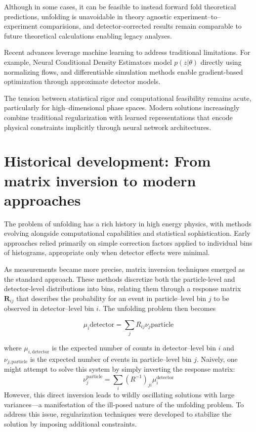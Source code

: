 Although in some cases, it can be feasible to instead forward fold theoretical predictions, unfolding is unavoidable in theory agnostic experiment--to--experiment comparisions, and detector-corrected results remain comparable to future theoretical calculations enabling legacy analyses.

Recent advances leverage machine learning to address traditional limitations. For example, Neural Conditional Density Estimators model \(p(z|\theta)\) directly using normalizing flows, and differentiable simulation methods enable gradient-based optimization through approximate detector models.

The tension between statistical rigor and computational feasibility remains acute, particularly for high--dimensional phase spaces.
%
Modern solutions increasingly combine traditional regularization with learned representations that encode physical constraints implicitly through neural network architectures.

\section{Historical development: From matrix inversion to modern approaches}
\label{sec:ill-posed}

The problem of unfolding has a rich history in high energy physics, with methods evolving alongside computational capabilities and statistical sophistication.
%
Early approaches relied primarily on simple correction factors applied to individual bins of histograms, appropriate only when detector effects were minimal.

As measurements became more precise, matrix inversion techniques emerged as the standard approach.
%
These methods discretize both the particle-level and detector-level distributions into bins, relating them through a response matrix \(\mathbf{R}_{ij}\) that describes the probability for an event in particle--level bin \(j\) to be observed in detector--level bin \(i\).
%
The unfolding problem then becomes

\begin{equation}
\mu_i{\text{detector}} = \sum_j R_{ij} \nu_j{\text{particle}}
\end{equation}

where \(\mu_{i, \textrm{detector}}\) is the expected number of counts in detector--level bin \(i\) and \(\nu_{j, \textrm{particle}}\) is the expected number of events in particle--level bin $j$.
%
Naively, one might attempt to solve this system by simply inverting the response matrix:
\begin{equation}
\nu_j^{\text{particle}} = \sum_i (R^{-1})_{ji} \mu_i^{\text{detector}}
\end{equation}
However, this direct inversion leads to wildly oscillating solutions with large variances---a manifestation of the ill-posed nature of the unfolding problem.
%
To address this issue, regularization techniques were developed to stabilize the solution by imposing additional constraints.

